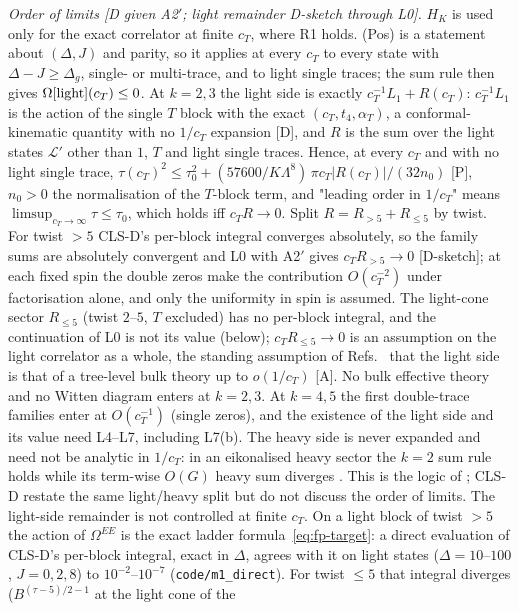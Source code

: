 \documentclass[aps,prl,onecolumn,superscriptaddress,nofootinbib]{revtex4-2}
\begin{document}
\emph{Order of limits [D given A2$'$; light remainder D-sketch through L0].} $H_K$ is used only for the exact correlator at finite $c_T$, where R1 holds. (Pos) is a statement
about $(\Delta,J)$ and parity, so it applies at every $c_T$ to every state with $\Delta-J\ge\Delta_g$, single- or multi-trace, and to
light single traces; the sum rule then gives $\Omega[{\rm light}](c_T)\le0$. At $k=2,3$ the light side is exactly
$c_T^{-1}L_1+R(c_T)$: $c_T^{-1}L_1$ is the action of the single $T$ block with the exact $(c_T,t_4,\alpha_T)$, a conformal-kinematic
quantity with no $1/c_T$ expansion [D], and $R$ is the sum over the light states $\mathcal L'$ other than $1$, $T$ and light single
traces. Hence, at every $c_T$ and with no light single trace, $\tau(c_T)^2\le\tau_0^2+(57600/K\Lambda^8)\,\pi c_T|R(c_T)|/(32n_0)$ [P],
$n_0>0$ the normalisation of the $T$-block term, and "leading order in $1/c_T$" means $\limsup_{c_T\to\infty}\tau\le\tau_0$, which holds
iff $c_TR\to0$. Split $R=R_{>5}+R_{\le5}$ by twist. For twist $>5$ CLS-D's per-block integral converges absolutely, so the family sums are
absolutely convergent and L0 with A2$'$ gives $c_TR_{>5}\to0$ [D-sketch]; at each fixed spin the double zeros make the
contribution $O(c_T^{-2})$ under factorisation alone, and only the uniformity in spin is assumed. The light-cone sector $R_{\le5}$
(twist $2$--$5$, $T$ excluded) has no per-block integral, and the continuation of L0 is not its value (below); $c_TR_{\le5}\to0$
is an assumption on the light correlator as a whole, the standing assumption of Refs.~\cite{CHMRS,CLSD} that the light side is that
of a tree-level bulk theory up to $o(1/c_T)$ [A]. No bulk effective theory and no Witten diagram enters at $k=2,3$. At $k=4,5$ the first double-trace families
enter at $O(c_T^{-1})$ (single zeros), and the existence of the light side and its value need L4--L7, including L7(b). The heavy side is never expanded and need not be
analytic in $1/c_T$: in an eikonalised heavy sector the $k=2$ sum rule holds while its term-wise $O(G)$ heavy sum diverges
\cite[Sec.~4.4]{CHMRS}. This is the logic of \cite[Sec.~1.1.3, eqs.~(1.12)--(1.14)]{CHMRS}; CLS-D restate the same light/heavy split
\cite[Sec.~2.2.2]{CLSD} but do not discuss the order of limits. The light-side remainder is not controlled at finite $c_T$. On a light block of twist $>5$ the action of $\Omega^{EE}$ is the exact ladder
formula~\eqref{eq:fp-target}: a direct evaluation of CLS-D's per-block integral, exact in $\Delta$, agrees with it on light states ($\Delta=10$--$100$,
$J=0,2,8$) to $10^{-2}$--$10^{-7}$ (\texttt{code/m1\_direct}). For twist $\le5$ that integral diverges ($B^{(\tau-5)/2-1}$ at the light cone of the
\end{document}
